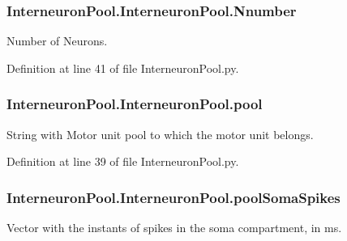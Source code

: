 \subsubsection[{\texorpdfstring{Nnumber}{Nnumber}}]{\setlength{\rightskip}{0pt plus 5cm}Interneuron\+Pool.\+Interneuron\+Pool.\+Nnumber}\hypertarget{class_interneuron_pool_1_1_interneuron_pool_a9cbb51ebce056563dee531b2a3de16ad}{}\label{class_interneuron_pool_1_1_interneuron_pool_a9cbb51ebce056563dee531b2a3de16ad}


Number of Neurons. 



Definition at line 41 of file Interneuron\+Pool.\+py.

\subsubsection[{\texorpdfstring{pool}{pool}}]{\setlength{\rightskip}{0pt plus 5cm}Interneuron\+Pool.\+Interneuron\+Pool.\+pool}\hypertarget{class_interneuron_pool_1_1_interneuron_pool_a08c57ed586708a120335dfe72c2d6460}{}\label{class_interneuron_pool_1_1_interneuron_pool_a08c57ed586708a120335dfe72c2d6460}


String with Motor unit pool to which the motor unit belongs. 



Definition at line 39 of file Interneuron\+Pool.\+py.

\subsubsection[{\texorpdfstring{pool\+Soma\+Spikes}{poolSomaSpikes}}]{\setlength{\rightskip}{0pt plus 5cm}Interneuron\+Pool.\+Interneuron\+Pool.\+pool\+Soma\+Spikes}\hypertarget{class_interneuron_pool_1_1_interneuron_pool_a9f887f427350168a5415b7a2918be778}{}\label{class_interneuron_pool_1_1_interneuron_pool_a9f887f427350168a5415b7a2918be778}


Vector with the instants of spikes in the soma compartment, in ms. 



